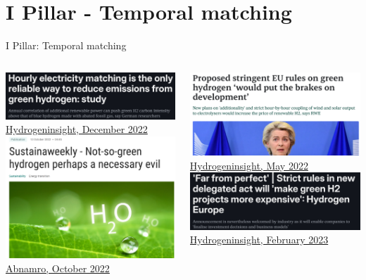 \section{I Pillar - Temporal matching}
\begin{frame}{I Pillar: Temporal matching}
	\begin{columns}[t]
		\begin{column}{0.5\textwidth}
				\includegraphics[width=0.7\linewidth]{images/h2_temporal_news4}
				\href{https://www.hydrogeninsight.com/electrolysers/hourly-electricity-matching-is-the-only-reliable-way-to-reduce-emissions-from-green-hydrogen-study/2-1-1378431}{Hydrogeninsight, December 2022}
				\includegraphics[width=0.7\linewidth]{images/h2_temporal_news1}
				\href{https://www.abnamro.com/research/en/our-research/sustainaweekly-not-so-green-hydrogen-perhaps-a-necessary-evil}{Abnamro, October 2022}
		\end{column}
	\begin{column}{0.5\textwidth}
		\includegraphics[width=0.7\linewidth]{images/h2_temporal_news2}
		\href{https://www.rechargenews.com/energy-transition/proposed-stringent-eu-rules-on-green-hydrogen-would-put-the-brakes-on-development-/2-1-1223746}{Hydrogeninsight, May 2022}
		\includegraphics[width=0.7\linewidth]{images/h2_temporal_news3}
		\href{https://www.hydrogeninsight.com/policy/far-from-perfect-strict-rules-in-new-delegated-act-will-make-green-h2-projects-more-expensive-hydrogen-europe/2-1-1403241}{Hydrogeninsight, February 2023}
		

\end{column}
\end{columns}
\end{frame}

